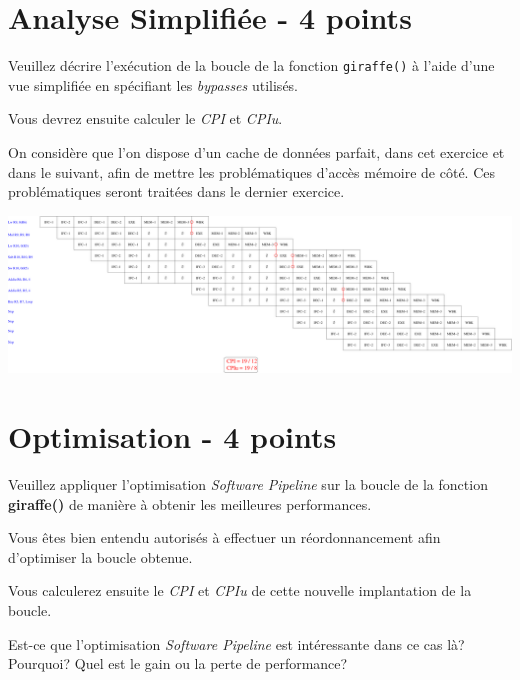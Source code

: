 %
%

\section{Analyse Simplifi\'ee - 4 points}

Veuillez d\'ecrire l'ex\'ecution de la boucle de la fonction
\texttt{giraffe()} \`a l'aide d'une vue simplifi\'ee en sp\'ecifiant les
\textit{bypasses} utilis\'es.

Vous devrez ensuite calculer le \textit{CPI} et \textit{CPIu}.

On consid\`ere que l'on dispose d'un cache de donn\'ees parfait, dans cet
exercice et dans le suivant, afin de mettre les probl\'ematiques d'acc\`es
m\'emoire de c\^ot\'e. Ces probl\'ematiques seront trait\'ees dans le
dernier exercice.

\begin{correction}

  \begin{center}
    \includegraphics[scale=0.25]{figures/correction-analyse-simplifiee.pdf}
  \end{center}

\end{correction}

%
%

\section{Optimisation - 4 points}

Veuillez appliquer l'optimisation \textit{Software Pipeline} sur
la boucle de la fonction \textbf{giraffe()} de mani\`ere \`a obtenir
les meilleures performances.

Vous \^etes bien entendu autoris\'es \`a effectuer un r\'eordonnancement
afin d'optimiser la boucle obtenue.

Vous calculerez ensuite le \textit{CPI} et \textit{CPIu} de cette nouvelle
implantation de la boucle.

Est-ce que l'optimisation \textit{Software Pipeline} est int\'eressante
dans ce cas l\`a? Pourquoi? Quel est le gain ou la perte de performance?

